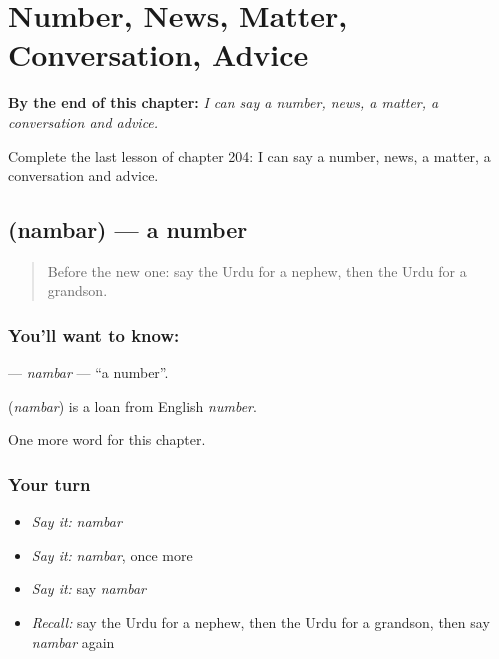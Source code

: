 
\chapter{Number, News, Matter, Conversation, Advice}
\label{ch:ur-number-news-matter-conversation-advice}

\begin{chapteropening}
\textbf{By the end of this chapter:} \emph{I can say a number, news, a matter, a conversation and advice.}

Complete the last lesson of chapter 204: I can say a number, news, a matter, a conversation and advice.
\end{chapteropening}

\section[\texorpdfstring{\ur{نمبر} (nambar)}{نمبر (nambar)}]{ (nambar) — a number}

\label{lesson:UR-C204-nambar}



\begin{quote}
Before the new one: say the Urdu for a nephew, then the Urdu for a grandson.
\end{quote}

\subsection*{You'll want to know: }
\textbf{} — \emph{nambar} — \textquotedblleft{}a number\textquotedblright{}.

\begin{cousinweb}
\textbf{} (\emph{nambar}) is a loan from English \emph{number}.
\end{cousinweb}

\begin{grammarlens}[title={What you've built}]
One more word for this chapter.
\end{grammarlens}

\subsection*{Your turn}
\begin{itemize}
\raggedright
  \item \emph{Say it:} \emph{nambar}
  \item \emph{Say it:} \emph{nambar}, once more
  \item \emph{Say it:} say \emph{nambar}
  \item \emph{Recall:} say the Urdu for a nephew, then the Urdu for a grandson, then say \emph{nambar} again
\end{itemize}


